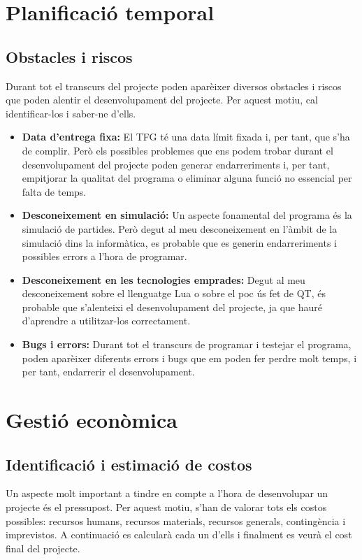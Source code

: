 \documentclass[a4paper]{article}
\begin{document}
\newpage
\section{Planificació temporal}
\subsection{Obstacles i riscos}
Durant tot el transcurs del projecte poden aparèixer diversos obstacles i riscos que poden alentir el desenvolupament del projecte. Per aquest motiu, cal identificar-los i saber-ne d'ells.

\begin{itemize}
    \item \textbf{Data d'entrega fixa:} El TFG té una data límit fixada i, per tant, que s'ha de complir. Però els possibles problemes que ens podem trobar durant el desenvolupament del projecte poden generar endarreriments i, per tant, empitjorar la qualitat del programa o eliminar alguna funció no essencial per falta de temps.
    \item \textbf{Desconeixement en simulació:} Un aspecte fonamental del programa és la simulació de partides. Però degut al meu desconeixement en l'àmbit de la simulació dins la informàtica, es probable que es generin endarreriments i possibles errors a l'hora de programar.
    \item \textbf{Desconeixement en les tecnologies emprades:} Degut al meu desconeixement sobre el llenguatge Lua o sobre el poc ús fet de QT, és probable que s'alenteixi el desenvolupament del projecte, ja que hauré d'aprendre a utilitzar-los correctament.
    \item \textbf{Bugs i errors:} Durant tot el transcurs de programar i testejar el programa, poden aparèixer diferents errors i bugs que em poden fer perdre molt temps, i per tant, endarrerir el desenvolupament.
\end{itemize}

\newpage
\section{Gestió econòmica}
\subsection{Identificació i estimació de costos}
Un aspecte molt important a tindre en compte a l'hora de desenvolupar un projecte és el pressupost. Per aquest motiu, s'han de valorar tots els costos possibles: recursos humans, recursos materials, recursos generals, contingència i imprevistos. A continuació es calcularà cada un d'ells i finalment es veurà el cost final del projecte.
\end{document}
